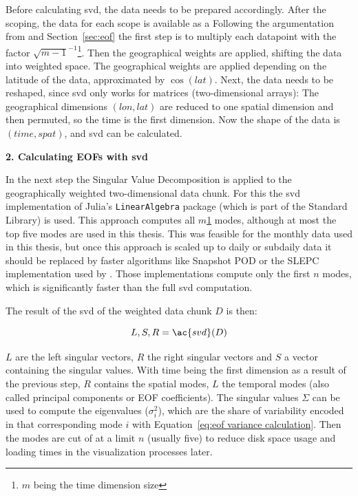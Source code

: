 Before calculating \ac{svd}, the data needs to be prepared accordingly. 
After the scoping, the data for each scope is available as a 
Following the argumentation from \cite{vietinghoffdiss} and Section~\ref{sec:eof} the first step is to multiply each datapoint with the factor $\sqrt{m-1}^{-1}$\footnote{\label{timesize}$m$ being the time dimension size}. 
Then the geographical weights are applied, shifting the data into weighted space. 
The geographical weights are applied depending on the latitude of the data, approximated by $\cos(lat)$. 
Next, the data needs to be reshaped, since \ac{svd} only works for matrices (two-dimensional arrays): The geographical dimensions $(lon, lat)$ are reduced to one spatial dimension and then permuted, so the time is the first dimension. 
Now the shape of the data is $(time, spat)$, and \ac{svd} can be calculated. 

\textbf{2. Calculating EOFs with \ac{svd}}

In the next step the Singular Value Decomposition is applied to the geographically weighted two-dimensional data chunk. 
For this the \ac{svd} implementation of Julia's \texttt{Linear\-Algebra} package (which is part of the Standard Library) is used.
This approach computes all $m$\cref{timesize} modes, although at most the top five modes are used in this thesis. 
This was feasible for the monthly data used in this thesis, but once this approach is scaled up to daily or subdaily data it should be replaced by faster algorithms like Snapshot POD or the SLEPC implementation used by \citeauthor{vietinghoffdiss} \cite{vietinghoffdiss}.
Those implementations compute only the first $n$ modes, which is significantly faster than the full \ac{svd} computation. 

The result of the \ac{svd} of the weighted data chunk $D$ is then:

\begin{equation}
\label{eq:SVD}
L,S,R = \ac{svd}(D)
\end{equation}

$L$ are the left singular vectors, $R$ the right singular vectors and $S$ a vector containing the singular values. 
With time being the first dimension as a result of the previous step, $R$ contains the spatial modes, $L$ the temporal modes (also called principal components or EOF coefficients). 
The singular values $\Sigma$ can be used to compute the eigenvalues ($\sigma_i^2$), which are  the share of variability encoded in that corresponding mode $i$ with Equation~\ref{eq:eof variance calculation}. 
Then the modes are cut of at a limit $n$ (usually five) to reduce disk space usage and loading times in the visualization processes later. 


